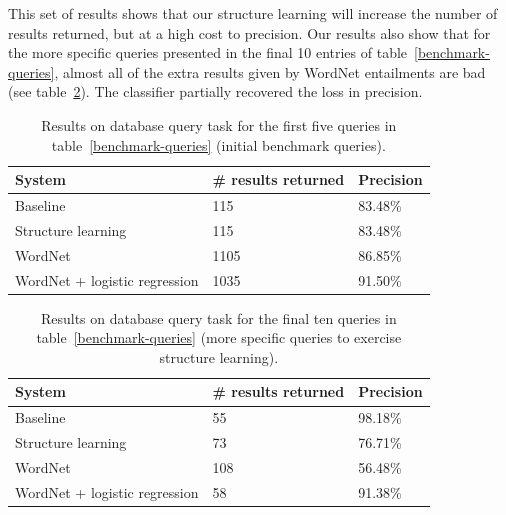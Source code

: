 \documentclass{article}
\begin{document}
This set of results shows that our structure learning will increase the number of results returned, but at a high cost to precision. Our results also show that for the more specific queries presented in the final 10 entries of table~\ref{benchmark-queries}, almost all of the extra results given by WordNet entailments are bad (see table~\ref{structure-results}). The classifier partially recovered the loss in precision.


\begin{table}[h]
  \caption{Results on database query task for the first five queries in table~\ref{benchmark-queries} (initial benchmark queries).}\label{results}
  \begin{center}
    \begin{tabular}{l l l}
      \toprule
      System & \# results returned & Precision\\
      \midrule
      Baseline & 115 & 83.48\%\\
      Structure learning & 115 & 83.48\%\\
      WordNet & 1105 & 86.85\% \\
      WordNet + logistic regression & 1035 & 91.50\%\\
      \bottomrule
    \end{tabular}
  \end{center}
\end{table}



\begin{table}[h]
  \caption{Results on database query task for the final ten queries in table~\ref{benchmark-queries} (more specific queries to exercise structure learning).}\label{structure-results}
  \begin{center}
    \begin{tabular}{l l l}
      \toprule
      System & \# results returned & Precision\\
      \midrule
      Baseline & 55 & 98.18\%\\
      Structure learning & 73 & 76.71\%\\
      WordNet & 108 & 56.48\% \\
      WordNet + logistic regression & 58 & 91.38\%\\
      \bottomrule
    \end{tabular}
  \end{center}
\end{table}
\end{document}
